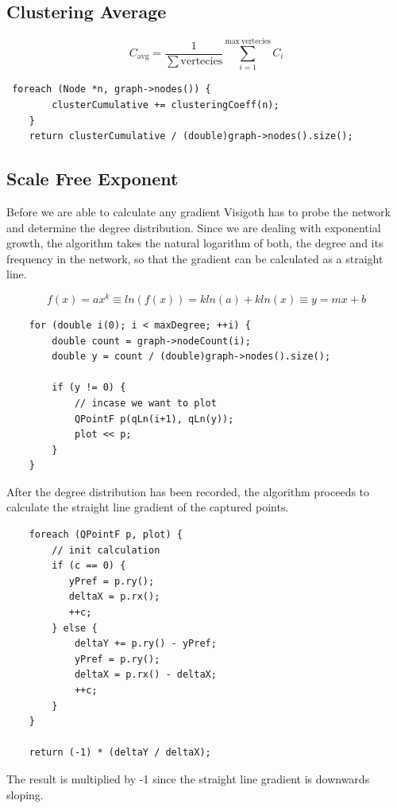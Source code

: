 \documentclass[a4paper,11pt,titlepage]{article}
\begin{document}
\subsection{Clustering Average}
\[
C_\mathrm{avg} = \frac{1}{\mathrm{\sum vertecies}}\sum_{i=1}^{\mathrm{max\
vertecies}} C_i
\]
\begin{lstlisting}
 foreach (Node *n, graph->nodes()) {
        clusterCumulative += clusteringCoeff(n);
    }
    return clusterCumulative / (double)graph->nodes().size();
\end{lstlisting}

\subsection{Scale Free Exponent}

Before we are able to calculate any gradient Visigoth has to probe the network
and determine the degree distribution. Since we are dealing with exponential
growth, the algorithm takes the natural logarithm of both, the degree and its
frequency in the network, so that the gradient can be calculated as a straight
line.

\[
f(x) = ax^k \equiv ln(f(x)) = kln(a) + kln(x) \equiv y = mx + b
\]

\begin{lstlisting}
    for (double i(0); i < maxDegree; ++i) {
        double count = graph->nodeCount(i);
        double y = count / (double)graph->nodes().size();

        if (y != 0) {
            // incase we want to plot
            QPointF p(qLn(i+1), qLn(y));
            plot << p;
        }
    }
\end{lstlisting}

After the degree distribution has been recorded, the algorithm proceeds to
calculate the straight line gradient of the captured points.

\begin{lstlisting}
    foreach (QPointF p, plot) {
        // init calculation
        if (c == 0) {
           yPref = p.ry();
           deltaX = p.rx();
           ++c;
        } else {
            deltaY += p.ry() - yPref;
            yPref = p.ry();
            deltaX = p.rx() - deltaX;
            ++c;
        }
    }

    return (-1) * (deltaY / deltaX);
\end{lstlisting}

The result is multiplied by -1 since the straight line gradient is downwards
sloping.
\end{document}
